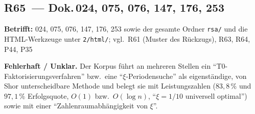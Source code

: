 \medskip

\subsection*{R65~--- Dok.\,024, 075, 076, 147, 176, 253}

\noindent\textbf{Betrifft:} 024, 075, 076, 147, 176, 253 sowie der
gesamte Ordner \texttt{rsa/} und die HTML-Werkzeuge unter
\texttt{2/html/}; vgl.\ R61 (Muster des Rückzugs), R63, R64, P44, P35

\smallskip\noindent\textbf{Fehlerhaft / Unklar.}\quad
Der Korpus führt an mehreren Stellen ein \enquote{T0-Faktorisierungs\-verfahren}
bzw.\ eine \enquote{$\xi$-Periodensuche} als eigenständige, von Shor
unterscheidbare Methode und belegt sie mit Leistungszahlen
($83{,}8\,\%$ und $97{,}1\,\%$ Erfolgsquote, $O(1)$ bzw.\ $O(\log n)$,
\enquote{$\xi = 1/10$ universell optimal}) sowie mit einer
\enquote{Zahlenraumabhängigkeit von $\xi$}.

